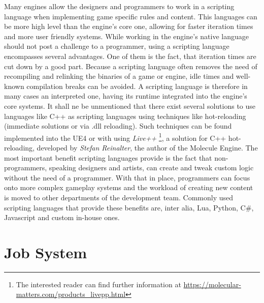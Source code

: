 Many engines allow the designers and programmers to work in a scripting language when implementing game specific rules and content. This languages can be more high level than the engine's core one, allowing for faster iteration times and more user friendly systems. While working in the engine's native language should not post a challenge to a programmer, using a scripting language encompasses several advantages. One of them is the fact, that iteration times are cut down by a good part. Because a scripting language often removes the need of recompiling and relinking the binaries of a game or engine, idle times and well-known compilation breaks can be avoided. A scripting language is therefore in many cases an interpreted one, having its runtime integrated into the engine's core systems. It shall ne be unmentioned that there exist several solutions to use languages like C++ as scripting languages using techniques like hot-reloading (immediate solutions or via .dll reloading). Such techniques can be found implemented into the \ac{UE4} or with using \textit{Live++} \footnote{The interested reader can find further information at \url{https://molecular-matters.com/products_livepp.html}}, a solution for C++ hot-reloading, developed by \textit{Stefan Reinalter}, the author of the Molecule Engine.
The most important benefit scripting languages provide is the fact that non-programmers, speaking designers and artists, can create and tweak custom logic without the need of a programmer. With that in place, programmers can focus onto more complex gameplay systems and the workload of creating new content is moved to other departments of the development team. Commonly used scripting languages that provide these benefits are, inter alia, Lua, Python, C\#, Javascript and custom in-house ones.

\section{Job System}

